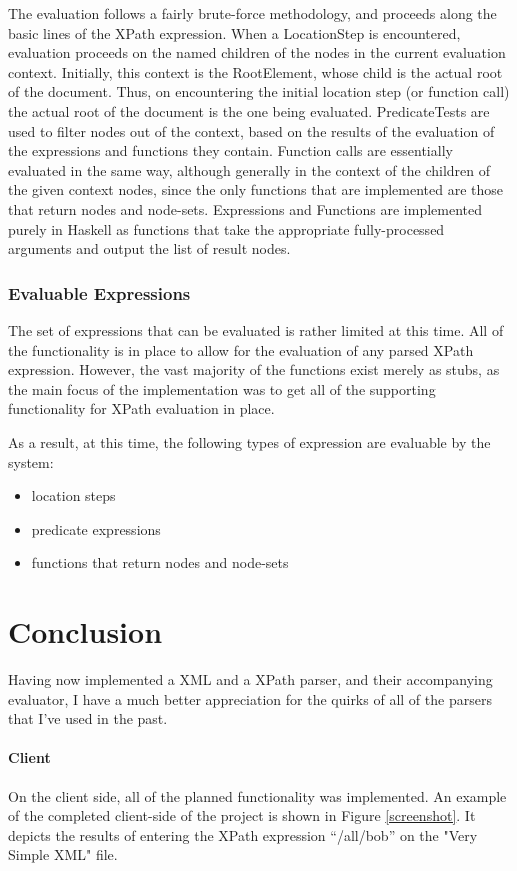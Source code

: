 \documentclass{acm_proc_article-sp}
\begin{document}
The evaluation follows a fairly brute-force methodology, and proceeds along the basic lines of the XPath expression.  When a LocationStep is encountered, evaluation proceeds on the named children of the nodes in the current evaluation context.  Initially, this context is the RootElement, whose child is the actual root of the document.  Thus, on encountering the initial location step (or function call) the actual root of the document is the one being evaluated.  PredicateTests are used to filter nodes out of the context, based on the results of the evaluation of the expressions and functions they contain.  Function calls are essentially evaluated in the same way, although generally in the context of the children of the given context nodes, since the only functions that are implemented are those that return nodes and node-sets.  Expressions and Functions are implemented purely in Haskell as functions that take the appropriate fully-processed arguments and output the list of result nodes.


\subsubsection{Evaluable Expressions}
The set of expressions that can be evaluated is rather limited at this time.  All of the functionality is in place to allow for the evaluation of any parsed XPath expression.  However, the vast majority of the functions exist merely as stubs, as the main focus of the implementation was to get all of the supporting functionality for XPath evaluation in place.

As a result, at this time, the following types of expression are evaluable by the system:
\begin{itemize}
	\item location steps
	\item predicate expressions
	\item functions that return nodes and node-sets
\end{itemize}


\section{Conclusion}
Having now implemented a XML and a XPath parser, and their accompanying evaluator, I have a much better appreciation for the quirks of all of the parsers that I've used in the past. 
\paragraph{Client}
On the client side, all of the planned functionality was implemented. An example of the completed client-side of the project is shown in Figure \ref{screenshot}.  It depicts the results of entering the XPath expression ``/all/bob'' on the "Very Simple XML" file.
\end{document}
